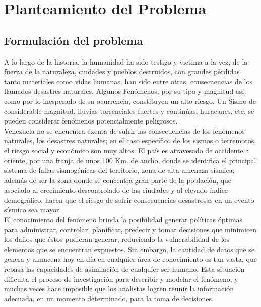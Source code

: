 \documentclass[12pt]{report}
\begin{document}
\newpage


	
	
	\vskip 1.5cm
	
	
	
	
	
	
	
	\chapter{Planteamiento del Problema}          %
	

	\section{Formulación del problema} 



A lo largo de la historia, la humanidad ha sido testigo y victima a la vez, de la fuerza de la naturaleza, ciudades y pueblos destruidos, con grandes pérdidas tanto materiales como vidas humanas, han sido entre otras, consecuencias de los llamados desastres naturales. Algunos Fenómenos, por su tipo y magnitud así como por lo inesperado de su ocurrencia, constituyen un alto riesgo. Un Sismo de considerable magnitud, lluvias torrenciales fuertes y continúas, huracanes, etc. se pueden considerar fenómenos potencialmente peligrosos. \\

Venezuela no se encuentra exenta de sufrir las consecuencias de los fenómenos naturales, los desastres naturales; en el caso específico de los sismos o terremotos, el riesgo social y económico son muy altos.  El país es atravesado de occidente a oriente, por una franja de unos 100 Km. de ancho, donde se identifica el principal sistema de fallas sismogénicas del territorio, zona de alta amenaza sísmica; además de ser la zona donde se concentra gran parte de la población, que asociado al crecimiento descontrolado de las ciudades y al elevado índice demográfico, hacen que el riesgo de sufrir consecuencias desastrosas en un evento sísmico sea mayor.\\

El conocimiento del fenómeno brinda la posibilidad generar políticas óptimas para administrar, controlar, planificar, predecir  y tomar decisiones que minimicen los daños que éstos pudieran generar, reduciendo la vulnerabilidad de los elementos que se encuentran expuestos. Sin embargo, la cantidad de datos que se genera y almacena hoy en día en cualquier área de conocimiento es tan vasta, que rebasa las capacidades de asimilación de cualquier ser humano. Esta situación dificulta el proceso de investigación para describir y modelar el fenómeno, y muchas veces hace imposible que los analistas logren reunir la información adecuada, en un momento determinado, para la toma de decisiones.\\
 
\end{document}
